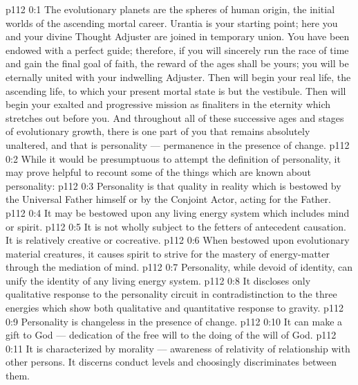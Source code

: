 \author{Solitary Messenger}
\vs p112 0:1 The evolutionary planets are the spheres of human origin, the initial worlds of the ascending mortal career. Urantia is your starting point; here you and your divine Thought Adjuster are joined in temporary union. You have been endowed with a perfect guide; therefore, if you will sincerely run the race of time and gain the final goal of faith, the reward of the ages shall be yours; you will be eternally united with your indwelling Adjuster. Then will begin your real life, the ascending life, to which your present mortal state is but the vestibule. Then will begin your exalted and progressive mission as finaliters in the eternity which stretches out before you. And throughout all of these successive ages and stages of evolutionary growth, there is one part of you that remains absolutely unaltered, and that is personality --- permanence in the presence of change.
\vs p112 0:2 \pc While it would be presumptuous to attempt the definition of personality, it may prove helpful to recount some of the things which are known about personality:
\vs p112 0:3 \bibnobreakspace Personality is that quality in reality which is bestowed by the Universal Father himself or by the Conjoint Actor, acting for the Father.
\vs p112 0:4 \bibnobreakspace It may be bestowed upon any living energy system which includes mind or spirit.
\vs p112 0:5 \bibnobreakspace It is not wholly subject to the fetters of antecedent causation. It is relatively creative or cocreative.
\vs p112 0:6 \bibnobreakspace When bestowed upon evolutionary material creatures, it causes spirit to strive for the mastery of energy\hyp{}matter through the mediation of mind.
\vs p112 0:7 \bibnobreakspace Personality, while devoid of identity, can unify the identity of any living energy system.
\vs p112 0:8 \bibnobreakspace It discloses only qualitative response to the personality circuit in contradistinction to the three energies which show both qualitative and quantitative response to gravity.
\vs p112 0:9 \bibnobreakspace Personality is changeless in the presence of change.
\vs p112 0:10 \bibnobreakspace It can make a gift to God --- dedication of the free will to the doing of the will of God.
\vs p112 0:11 \bibnobreakspace It is characterized by morality --- awareness of relativity of relationship with other persons. It discerns conduct levels and choosingly discriminates between them.

